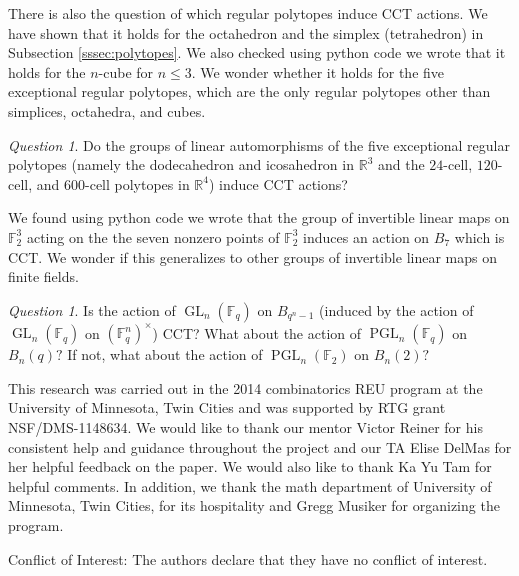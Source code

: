 \documentclass[smallextended, envcountsame, numbook]{svjour3}
\theoremstyle{plain}
\theoremstyle{definition}
\theoremstyle{remark}
\newtheorem{que}[thm]{Question}
\numberwithin{equation}{section}
\begin{document}
There is also the question of which regular polytopes induce CCT actions. We have shown that it holds for the octahedron and the simplex (tetrahedron) in Subsection \ref{sssec:polytopes}. We also checked using python code we wrote that it holds for the $n$-cube for $n \leq 3$. We wonder whether it holds for the five exceptional regular polytopes, which are the only regular polytopes other than simplices, octahedra, and cubes.

\begin{que}
\label{question:exceptional_polytopes_cct}
Do the groups of linear automorphisms of the five exceptional regular polytopes (namely the dodecahedron and icosahedron in $\mathbb R^3$ and the $24$-cell, $120$-cell, and $600$-cell polytopes in $\mathbb R^4$) induce CCT actions?
\end{que}

We found using python code we wrote that the group of invertible linear maps on $\mathbb F_2^3$ acting on the the seven nonzero points of $\mathbb F_2^3$ induces an action on $B_7$ which is CCT. We wonder if this generalizes to other groups of invertible linear maps on finite fields.

\begin{que}
Is the action of $\operatorname{GL}_n(\mathbb F_q)$ on $B_{q^n-1}$ (induced by the action of $\operatorname{GL}_n(\mathbb F_q)$ on $(\mathbb F_q^n)^\times$) CCT? What about the action of $\operatorname{PGL}_n(\mathbb F_q)$ on $B_n(q)?$ If not, what about the action of $\operatorname{PGL}_n(\mathbb F_2)$ on $B_n(2)?$ 
\end{que}

\begin{acknowledgements}
This research was carried out in the 2014 combinatorics REU program at the University of Minnesota, Twin Cities and was supported by RTG grant NSF/DMS-1148634.
We would like to thank our mentor Victor Reiner for his consistent help and guidance throughout the project and our TA Elise DelMas for her helpful feedback on the paper. We would also like to thank Ka Yu Tam for helpful comments.  In addition, we thank the math department of University of Minnesota, Twin Cities, for its hospitality and Gregg Musiker for organizing the program.
\end{acknowledgements}

Conflict of Interest: The authors declare that they have no conflict of interest.

\medskip 

\nocite{*}


\end{document}
